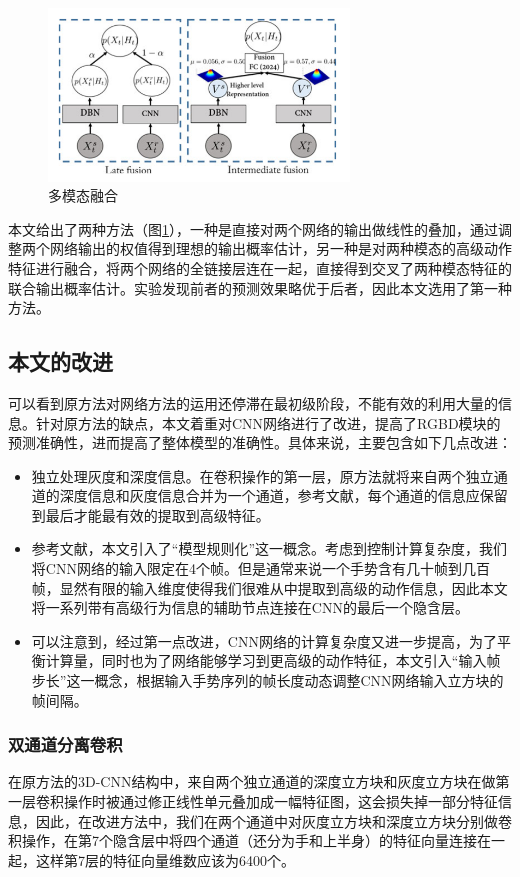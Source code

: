 \documentclass[a4paper, 12pt]{article}
\begin{document}
\begin{figure}[ht]
  \centering
  \includegraphics[width=8cm]{fusion.png}
  \caption{\label{fig:4}多模态融合}
\end{figure}

本文给出了两种方法（图\ref{fig:4}），一种是直接对两个网络的输出做线性的叠加，通过调整两个网络输出的权值得到理想的输出概率估计，另一种是对两种模态的高级动作特征进行融合，将两个网络的全链接层连在一起，直接得到交叉了两种模态特征的联合输出概率估计。实验发现前者的预测效果略优于后者，因此本文选用了第一种方法。

\subsection{本文的改进}
可以看到原方法对网络方法的运用还停滞在最初级阶段，不能有效的利用大量的信息。针对原方法的缺点，本文着重对CNN网络进行了改进，提高了RGBD模块的预测准确性，进而提高了整体模型的准确性。具体来说，主要包含如下几点改进：

\begin{itemize}
\item 独立处理灰度和深度信息。在卷积操作的第一层，原方法就将来自两个独立通道的深度信息和灰度信息合并为一个通道，参考文献\cite{p5}，每个通道的信息应保留到最后才能最有效的提取到高级特征。
\item
参考文献\cite{p3}，本文引入了“模型规则化”这一概念。考虑到控制计算复杂度，我们将CNN网络的输入限定在4个帧。但是通常来说一个手势含有几十帧到几百帧，显然有限的输入维度使得我们很难从中提取到高级的动作信息，因此本文将一系列带有高级行为信息的辅助节点连接在CNN的最后一个隐含层。
\item 可以注意到，经过第一点改进，CNN网络的计算复杂度又进一步提高，为了平衡计算量，同时也为了网络能够学习到更高级的动作特征，本文引入“输入帧步长”这一概念，根据输入手势序列的帧长度动态调整CNN网络输入立方块的帧间隔。
\end{itemize}

\subsubsection{双通道分离卷积}
在原方法的3D-CNN结构中，来自两个独立通道的深度立方块和灰度立方块在做第一层卷积操作时被通过修正线性单元叠加成一幅特征图，这会损失掉一部分特征信息，因此，在改进方法中，我们在两个通道中对灰度立方块和深度立方块分别做卷积操作，在第7个隐含层中将四个通道（还分为手和上半身）的特征向量连接在一起，这样第7层的特征向量维数应该为6400个。
\end{document}
